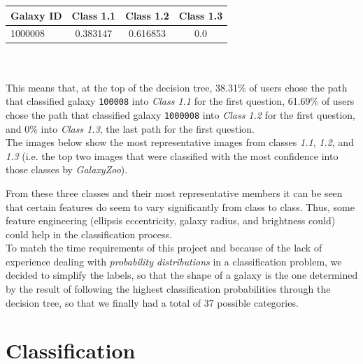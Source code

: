 \documentclass{vldb}
\begin{document}
\begin{tabularx}{0.44\textwidth}{ | X | c | c | c | }
       \hline
       \textbf{Galaxy ID} & \textbf{Class 1.1} & \textbf{Class 1.2} & \textbf{Class 1.3} \\
       \hline
       1000008 & 0.383147 & 0.616853 & 0.0 \\
       \hline
\end{tabularx} \\\\

This means that, at the top of the decision tree, 38.31\% of users chose the path that classified galaxy \texttt{100008} into \emph{Class 1.1} for the first question, 61.69\% of users chose the path that classified galaxy \texttt{1000008} into \emph{Class 1.2} for the first question, and 0\% into \emph{Class 1.3}, the last path for the first question. \\

The images below show the most representative images from classes \emph{1.1}, \emph{1.2}, and \emph{1.3} (i.e. the top two images that were classified with the most confidence into those classes by \emph{GalaxyZoo}).


From these three classes and their most representative members it can be seen that certain features do seem to vary significantly from class to class. Thus, some feature engineering (ellipsis eccentricity, galaxy radius, and brightness could) could help in the classification process. \\

To match the time requirements of this project and because of the lack of experience dealing with \emph{probability distributions} in a classification problem, we decided to simplify the labels, so that the shape of a galaxy is the one determined by the result of following the highest classification probabilities through the decision tree, so that we finally had a total of 37 possible categories.

\newpage
\section{Classification}
\end{document}
